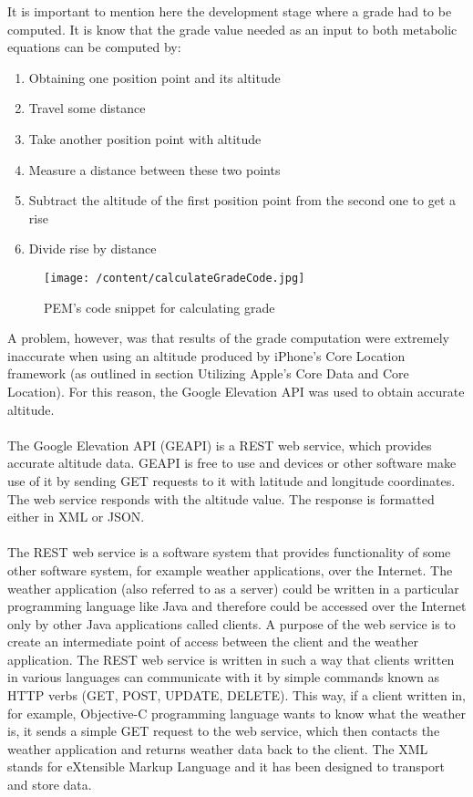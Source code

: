 \documentclass[12pt, a4paper]{report}   %
\begin{document}
\begin{enumerate}
\clearpage
It is important to mention here the development stage where a grade had to be computed. 
It is know that the grade value needed as an input to both metabolic equations can be computed by:\\
\begin{enumerate}
	\item Obtaining one position point and its altitude
	\item Travel some distance
	\item Take another position point with altitude
	\item Measure a distance between these two points
	\item Subtract the altitude of the first position point from the second one to get a rise
	\item Divide rise by distance\\
\end{enumerate}


\begin{figure}[H]
  \centering
	\texttt{[image: /content/calculateGradeCode.jpg]}
	  \caption{PEM's code snippet for calculating grade}
\end{figure}


A problem, however, was that results of the grade computation were extremely inaccurate when using an altitude produced by iPhone's Core Location framework (as outlined in section Utilizing Apple's Core Data and Core Location). For this reason, the Google Elevation API was used to obtain accurate altitude.
\\ \\
The Google Elevation API (GEAPI) is a REST web service, which provides accurate altitude data. GEAPI is free to use and devices or other software make use of it by sending GET requests to it with latitude and longitude coordinates. The web service responds with the altitude value. The response is formatted either in XML or JSON.\\ \\
The REST web service is a software system that provides functionality of some other software system, for example weather applications, over the Internet. The weather application (also referred to as a server) could be written in a particular programming language like Java and therefore could be accessed over the Internet only by other Java applications called clients. A purpose of the web service is to create an intermediate point of access between the client and the weather application. The REST web service is written in such a way that clients written in various languages can communicate with it by simple commands known as HTTP verbs (GET, POST, UPDATE, DELETE). This way, if a client written in, for example, Objective-C programming language wants to know what the weather is, it sends a simple GET request to the web service, which then contacts the weather application and returns weather data back to the client.
The XML stands for eXtensible Markup Language and it has been designed to transport and store data.



\end{enumerate}
\end{document}

